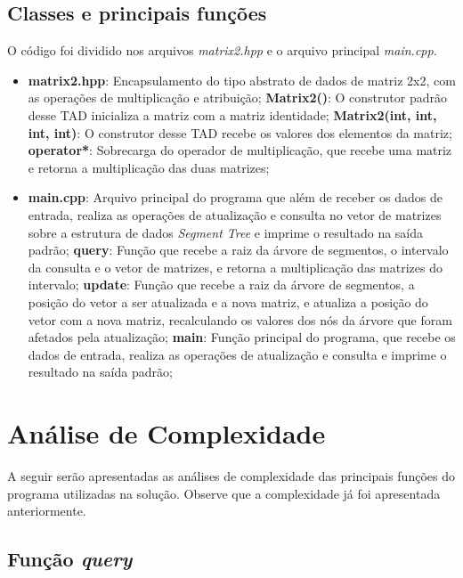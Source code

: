 \documentclass{article}
\begin{document}
\subsection{Classes e principais funções}
O código foi dividido nos arquivos \emph{matrix2.hpp} e o arquivo principal \emph{main.cpp}.
\begin{itemize}
    \item \textbf{matrix2.hpp}: Encapsulamento do tipo abstrato de dados de matriz 2x2, com as operações de multiplicação e atribuição;
        \subitem \textbf{Matrix2()}: O construtor padrão desse TAD inicializa a matriz com a matriz identidade;
        \subitem \textbf{Matrix2(int, int, int, int)}: O construtor desse TAD recebe os valores dos elementos da matriz;
        \subitem \textbf{operator*}: Sobrecarga do operador de multiplicação, que recebe uma matriz e retorna a multiplicação das duas matrizes; 

    \item \textbf{main.cpp}: Arquivo principal do programa que além de receber os dados de entrada, realiza as operações de atualização e consulta no vetor de matrizes sobre a estrutura de dados \emph{Segment Tree} e imprime o resultado na saída padrão;
        \subitem \textbf{query}: Função que recebe a raiz da árvore de segmentos, o intervalo da consulta e o vetor de matrizes, e retorna a multiplicação das matrizes do intervalo;
        \subitem \textbf{update}: Função que recebe a raiz da árvore de segmentos, a posição do vetor a ser atualizada e a nova matriz, e atualiza a posição do vetor com a nova matriz, recalculando os valores dos nós da árvore que foram afetados pela atualização;
        \subitem \textbf{main}: Função principal do programa, que recebe os dados de entrada, realiza as operações de atualização e consulta e imprime o resultado na saída padrão; 
    
\end{itemize}

\section{Análise de Complexidade}

A seguir serão apresentadas as análises de complexidade das principais funções do programa utilizadas na solução.
Observe que a complexidade já foi apresentada anteriormente.

\subsection{Função \emph{query}}
\end{document}
